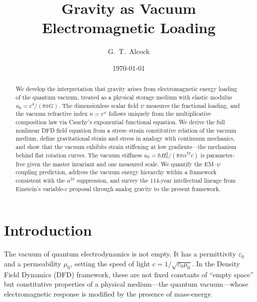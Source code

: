 \documentclass[aps,prd,twocolumn,superscriptaddress,nofootinbib]{revtex4-2}
\begin{document}
\title{Gravity as Vacuum Electromagnetic Loading}

\author{G.~T.~Alcock}

\date{\today}

\begin{abstract}
We develop the interpretation that gravity arises from electromagnetic
energy loading of the quantum vacuum, treated as a physical storage
medium with elastic modulus $u_0 = c^4/(8\pi G)$.  The dimensionless
scalar field $\psi$ measures the fractional loading, and the vacuum
refractive index $n = e^\psi$ follows uniquely from the multiplicative
composition law via Cauchy's exponential functional equation.  We derive
the full nonlinear DFD field equation from a stress--strain constitutive
relation of the vacuum medium, define gravitational strain and stress
in analogy with continuum mechanics, and show that the vacuum exhibits
strain stiffening at low gradients---the mechanism behind flat rotation
curves.  The vacuum stiffness $u_0 = \hbar H_0^2/(8\pi\alpha^{57}c)$
is parameter-free given the master invariant and one measured scale.
We quantify the EM--$\psi$ coupling prediction, address the vacuum
energy hierarchy within a framework consistent with the $\alpha^{57}$
suppression, and survey the 114-year intellectual lineage from Einstein's
variable-$c$ proposal through analog gravity to the present framework.
\end{abstract}

\maketitle


\section{Introduction}
\label{sec:intro}

The vacuum of quantum electrodynamics is not empty.  It has a
permittivity $\varepsilon_0$ and a permeability $\mu_0$, setting the
speed of light $c = 1/\sqrt{\varepsilon_0\mu_0}$.  In the Density
Field Dynamics (DFD) framework, these are not fixed constants of
``empty space'' but constitutive properties of a physical medium---the
quantum vacuum---whose electromagnetic response is modified by the
presence of mass-energy.
\end{document}
